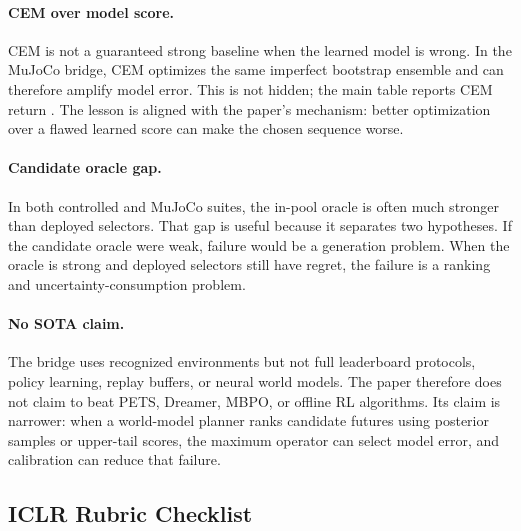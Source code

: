 \documentclass{article}
\begin{document}
\paragraph{CEM over model score.}
CEM is not a guaranteed strong baseline when the learned model is wrong. In
the MuJoCo bridge, CEM optimizes the same imperfect bootstrap ensemble and can
therefore amplify model error. This is not hidden; the main table reports CEM
return \VFourMujocoCEMReturn{}. The lesson is aligned with the paper's
mechanism: better optimization over a flawed learned score can make the chosen
sequence worse.

\paragraph{Candidate oracle gap.}
In both controlled and MuJoCo suites, the in-pool oracle is often much stronger
than deployed selectors. That gap is useful because it separates two
hypotheses. If the candidate oracle were weak, failure would be a generation
problem. When the oracle is strong and deployed selectors still have regret,
the failure is a ranking and uncertainty-consumption problem.

\paragraph{No SOTA claim.}
The bridge uses recognized environments but not full leaderboard protocols,
policy learning, replay buffers, or neural world models. The paper therefore
does not claim to beat PETS, Dreamer, MBPO, or offline RL algorithms. Its claim
is narrower: when a world-model planner ranks candidate futures using
posterior samples or upper-tail scores, the maximum operator can select model
error, and calibration can reduce that failure.

\subsection{ICLR Rubric Checklist}
\end{document}

